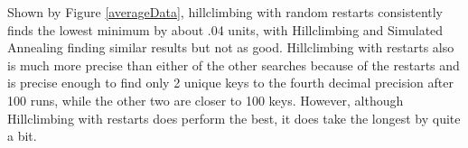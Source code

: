 \documentclass{article}
\begin{document}
Shown by Figure \ref{averageData}, hillclimbing with random restarts consistently finds the lowest minimum by about .04 units, with Hillclimbing and Simulated Annealing finding similar results but not as good. Hillclimbing with restarts also is much more precise than either of the other searches because of the restarts and is precise enough to find only 2 unique keys to the fourth decimal precision after 100 runs, while the other two are closer to 100 keys. However, although Hillclimbing with restarts does perform the best, it does take the longest by quite a bit.  
\end{document}
